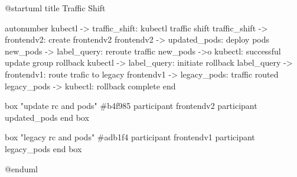 @startuml
title Traffic Shift

autonumber
kubectl -> traffic_shift: kubectl traffic shift
traffic_shift -> frontendv2: create frontendv2
frontendv2 -> updated_pods: deploy pods
new_pods -> label_query: reroute traffic
new_pods ->o kubectl: successful update
group rollback
  kubectl -> label_query: initiate rollback
  label_query -> frontendv1: route trafic to legacy
  frontendv1 -> legacy_pods: traffic routed
  legacy_pods -> kubectl: rollback complete
end

box "update rc and pods" #b4f985
  participant frontendv2
  participant updated_pods
end box

box "legacy rc and pods" #adb1f4
  participant frontendv1
  participant legacy_pods
end box

@enduml
